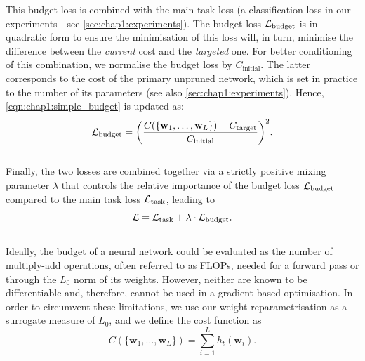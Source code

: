 \noindent This budget loss is combined with the main task loss (a classification
loss in our experiments - see \cref{sec:chap1:experiments}). The budget loss $
{\cal L}_\text{budget}$ is in quadratic form to ensure the minimisation of this
loss will, in turn, minimise the difference between the {\em current} cost and
the {\em targeted} one. For better conditioning of this combination, we
normalise the budget loss by $C_\text{initial}$. The latter corresponds to the
cost of the primary unpruned network, which is set in practice to the number of
its parameters (see also \cref{sec:chap1:experiments}). Hence,
\cref{eqn:chap1:simple_budget} is updated as:\\

\begin{equation}
  \label{eqn:chap1:real_budget}
  {\cal L}_\text{budget} = \biggl( \displaystyle\frac{C(\{\mathbf{w}_1,\dots, \mathbf{w}_L\}) - C_\text{target}}{C_\text{initial}} \biggr)^2.
\end{equation}\\

Finally, the two losses are combined together via a strictly positive mixing
parameter $\lambda$ that  controls the relative importance of  the budget loss
${\cal L}_\text{budget}$ compared to the main task loss ${\cal L}_\text{task}$,
leading to\\

\begin{equation}
  \label{eqn:chap1:globalloss}
   {\cal L} =  {\cal L}_\text{task} + \lambda \cdot {\cal L}_\text{budget}.
\end{equation} \\

Ideally, the budget of a neural network could be evaluated as the number of
multiply-add operations, often referred to as \ac{FLOPs}, needed for a forward
pass or through the $L_0$ norm of its weights. However, neither are known to
be differentiable and, therefore, cannot be used in a gradient-based
optimisation. In order to circumvent these limitations, we use our weight
reparametrisation as a surrogate measure of $L_0$, and we define the cost
function as \\

\begin{equation}
  \label{eqn:chap1:cost_function}
  C(\{\mathbf{w}_1,\dots, \mathbf{w}_L\}) = \displaystyle \sum_{i=1}^{L} h_t(\mathbf{w}_i). 
\end{equation} \\


